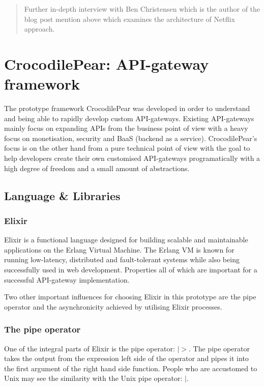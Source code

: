 \documentclass{cslthse-msc}
\begin{document}
\begin{quote}
	Further in-depth interview with Ben Christensen which is the author of the blog post mention above which examines the architecture of Netflix approach.
\end{quote}

\chapter{CrocodilePear: API-gateway framework}

The prototype framework CrocodilePear was developed in order to understand and being able to rapidly develop custom API-gateways. Existing API-gateways mainly focus on expanding APIs from the business point of view with a heavy focus on monetisation, security and BaaS (backend as a service). CrocodilePear's focus is on the other hand from a pure technical point of view with the goal to help developers create their own customised API-gateways programatically with a high degree of freedom and a small amount of abstractions.

\section{Language \& Libraries}
\subsection{Elixir}
Elixir is a functional language designed for building scalable and maintainable applications on the Erlang Virtual Machine. The Erlang VM is known for running low-latency, distributed and fault-tolerant systems while also being successfully used in web development\cite{elixir}. Properties all of which are important for a successful API-gateway implementation.

Two other important influences for choosing Elixir in this prototype are the pipe operator and the asynchronicity achieved by utilising Elixir processes.

\subsection{The pipe operator}
One of the integral parts of Elixir is the pipe operator: $|>$. The pipe operator takes the output from the expression left side of the operator and pipes it into the first argument of the right hand side function. People who are accustomed to Unix may see the similarity with the Unix pipe operator: $|$.
\end{document}
